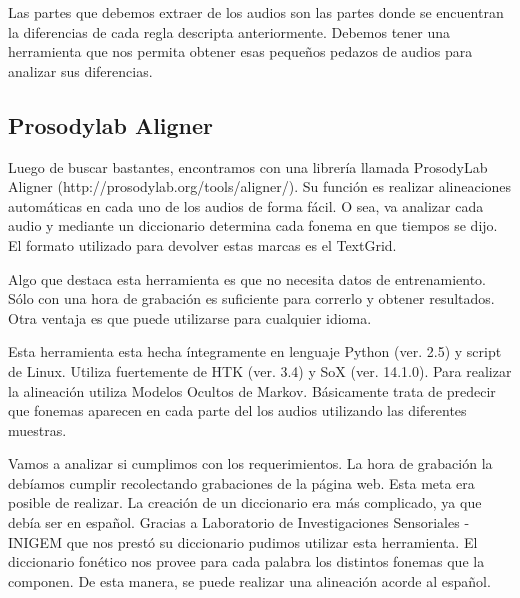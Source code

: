 \documentclass[11pt,a4paper,twoside]{tesis}
\begin{document}
Las partes que debemos extraer de los audios son las partes donde se encuentran la diferencias de cada regla descripta anteriormente. Debemos tener una herramienta que nos permita obtener esas pequeños pedazos de audios para analizar sus diferencias. 

\subsection{Prosodylab Aligner}


Luego de buscar bastantes, encontramos con una librería llamada ProsodyLab Aligner (http://prosodylab.org/tools/aligner/). Su función es realizar alineaciones automáticas en cada uno de los audios de forma fácil. O sea, va analizar cada audio y mediante un diccionario determina cada fonema en que tiempos se dijo. El formato utilizado para devolver estas marcas es el TextGrid. 

Algo que destaca esta herramienta es que no necesita datos de entrenamiento. Sólo con una hora de grabación es suficiente para correrlo y obtener resultados. Otra ventaja es que puede utilizarse para cualquier idioma. 

Esta herramienta esta hecha íntegramente en lenguaje Python (ver. 2.5) y script de Linux. Utiliza fuertemente de HTK (ver. 3.4) y SoX (ver. 14.1.0). Para realizar la alineación utiliza Modelos Ocultos de Markov. Básicamente trata de predecir que fonemas aparecen en cada parte del los audios utilizando las diferentes muestras.


Vamos a analizar si cumplimos con los requerimientos. La hora de grabación la debíamos cumplir recolectando grabaciones de la página web. Esta meta era posible de realizar. La creación de un diccionario era más complicado, ya que debía ser en español. Gracias a Laboratorio de Investigaciones Sensoriales - INIGEM que nos prestó su diccionario pudimos utilizar esta herramienta. El diccionario fonético nos provee para cada palabra los distintos fonemas que la componen. De esta manera, se puede realizar una alineación acorde al español.
\end{document}
